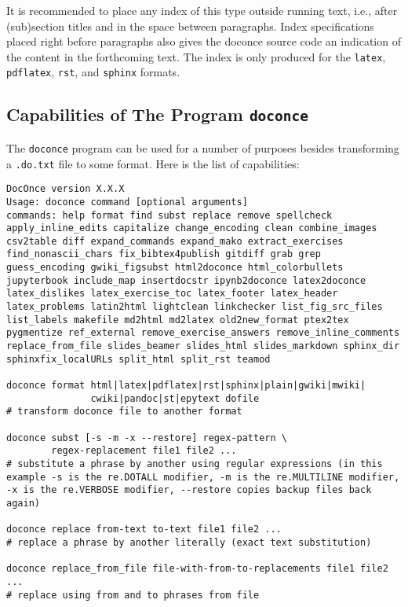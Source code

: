 \documentclass[%
oneside,                 %
final,                   %
10pt]{article}
\newcounter{doconce:movie:counter}
\begin{document}
It is recommended to place any index of this type outside
running text, i.e., after (sub)section titles and in the space between
paragraphs. Index specifications placed right before paragraphs also
gives the doconce source code an indication of the content in the
forthcoming text. The index is only produced for the \texttt{latex},
\texttt{pdflatex}, \texttt{rst}, and \texttt{sphinx} formats.
\subsection{Capabilities of The Program \texttt{doconce} }
The \texttt{doconce} program can be used for a number of purposes besides
transforming a \texttt{.do.txt} file to some format. Here is the
list of capabilities:
\begin{Verbatim}[numbers=none,fontsize=\fontsize{9pt}{9pt},baselinestretch=0.95,xleftmargin=2mm]
DocOnce version X.X.X
Usage: doconce command [optional arguments]
commands: help format find subst replace remove spellcheck apply_inline_edits capitalize change_encoding clean combine_images csv2table diff expand_commands expand_mako extract_exercises find_nonascii_chars fix_bibtex4publish gitdiff grab grep guess_encoding gwiki_figsubst html2doconce html_colorbullets jupyterbook include_map insertdocstr ipynb2doconce latex2doconce latex_dislikes latex_exercise_toc latex_footer latex_header latex_problems latin2html lightclean linkchecker list_fig_src_files list_labels makefile md2html md2latex old2new_format ptex2tex pygmentize ref_external remove_exercise_answers remove_inline_comments replace_from_file slides_beamer slides_html slides_markdown sphinx_dir sphinxfix_localURLs split_html split_rst teamod

doconce format html|latex|pdflatex|rst|sphinx|plain|gwiki|mwiki|
               cwiki|pandoc|st|epytext dofile 
# transform doconce file to another format

doconce subst [-s -m -x --restore] regex-pattern \ 
        regex-replacement file1 file2 ... 
# substitute a phrase by another using regular expressions (in this example -s is the re.DOTALL modifier, -m is the re.MULTILINE modifier, -x is the re.VERBOSE modifier, --restore copies backup files back again)

doconce replace from-text to-text file1 file2 ...                      
# replace a phrase by another literally (exact text substitution)

doconce replace_from_file file-with-from-to-replacements file1 file2 ... 
# replace using from and to phrases from file


\end{Verbatim}
\end{document}
